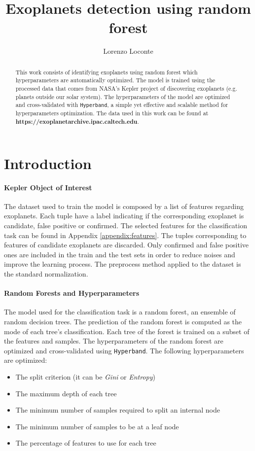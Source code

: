 \documentclass[11pt, a4paper]{article}
\date{}
\title{Exoplanets detection using random forest}
\author{Lorenzo Loconte}
\begin{document}
\maketitle
\begin{abstract}
  This work consists of identifying exoplanets using random forest which hyperparameters are automatically optimized.
  The model is trained using the processed data that comes from NASA's Kepler project of discovering exoplanets (e.g. planets outside our solar system).
  The hyperparameters of the model are optimized and cross-validated with \texttt{Hyperband}, a simple yet effective and scalable method for hyperparameters optimization.
  The data used in this work can be found at \textbf{https://exoplanetarchive.ipac.caltech.edu}.
\end{abstract}

\section{Introduction}
  \paragraph{Kepler Object of Interest}
    The dataset used to train the model is composed by a list of features regarding exoplanets. Each tuple have a label indicating if the corresponding exoplanet is candidate, false positive or confirmed. The selected features for the classification task can be found in Appendix \ref{appendix:features}. The tuples corresponding to features of candidate exoplanets are discarded. Only confirmed and false positive ones are included in the train and the test sets in order to reduce noises and improve the learning process. The preprocess method applied to the dataset is the standard normalization.

  \paragraph{Random Forests and Hyperparameters}
    The model used for the classification task is a random forest, an ensemble of random decision trees. The prediction of the random forest is computed as the mode of each tree's classification. Each tree of the forest is trained on a subset of the features and samples.
    The hyperparameters of the random forest are optimized and cross-validated using \texttt{Hyperband}. The following hyperparameters are optimized:
    \begin{itemize}
      \item The split criterion (it can be \textit{Gini} or \textit{Entropy})
      \item The maximum depth of each tree
      \item The minimum number of samples required to split an internal node
      \item The minimum number of samples to be at a leaf node
      \item The percentage of features to use for each tree
    \end{itemize}
\end{document}
